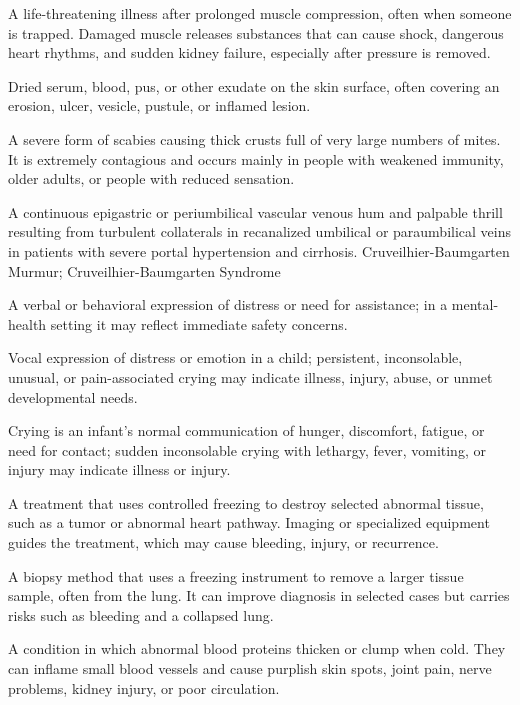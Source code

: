  A life-threatening illness after prolonged muscle compression, often when someone is trapped. Damaged muscle releases substances that can cause shock, dangerous heart rhythms, and sudden kidney failure, especially after pressure is removed.

 Dried serum, blood, pus, or other exudate on the skin surface, often covering an erosion, ulcer, vesicle, pustule, or inflamed lesion.

 A severe form of scabies causing thick crusts full of very large numbers of mites. It is extremely contagious and occurs mainly in people with weakened immunity, older adults, or people with reduced sensation.

 A continuous epigastric or periumbilical vascular venous hum and palpable thrill resulting from turbulent collaterals in recanalized umbilical or paraumbilical veins in patients with severe portal hypertension and cirrhosis.
\synonyms
Cruveilhier-Baumgarten Murmur; Cruveilhier-Baumgarten Syndrome

 A verbal or behavioral expression of distress or need for assistance; in a mental-health setting it may reflect immediate safety concerns.

 Vocal expression of distress or emotion in a child; persistent, inconsolable, unusual, or pain-associated crying may indicate illness, injury, abuse, or unmet developmental needs.

 Crying is an infant’s normal communication of hunger, discomfort, fatigue, or need for contact; sudden inconsolable crying with lethargy, fever, vomiting, or injury may indicate illness or injury.

 A treatment that uses controlled freezing to destroy selected abnormal tissue, such as a tumor or abnormal heart pathway. Imaging or specialized equipment guides the treatment, which may cause bleeding, injury, or recurrence.

 A biopsy method that uses a freezing instrument to remove a larger tissue sample, often from the lung. It can improve diagnosis in selected cases but carries risks such as bleeding and a collapsed lung.

 A condition in which abnormal blood proteins thicken or clump when cold. They can inflame small blood vessels and cause purplish skin spots, joint pain, nerve problems, kidney injury, or poor circulation.

